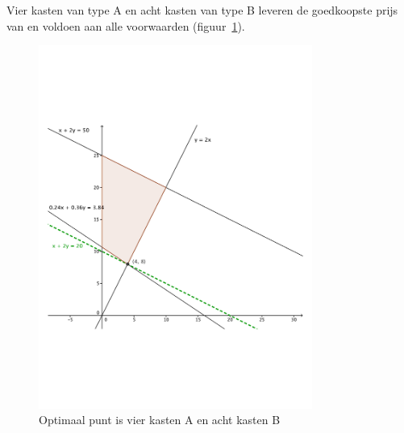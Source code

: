 \begin{Oplossing}{4.2}
     Vier kasten van type A en acht kasten van type  B leveren de goedkoopste prijs van  en voldoen aan alle voorwaarden (figuur~\ref{fig:kastenAB}).
          \begin{figure}[hbtp]
\centering
\includegraphics[width=0.8\textwidth]{oefeningen/FigurenLP/OefkastenAB.pdf}
\caption{Optimaal punt is vier kasten A en acht kasten B}
\label{fig:kastenAB}
\end{figure}
     
\end{Oplossing}
